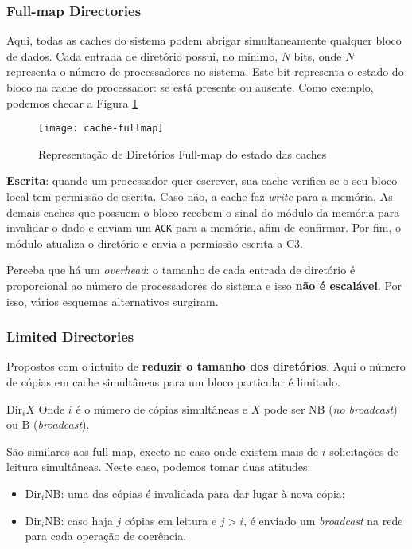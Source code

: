\subsubsection{Full-map Directories}
Aqui, todas as caches do sistema podem abrigar simultaneamente qualquer bloco de dados. Cada entrada de diretório possui, no mínimo, $N$ bits, onde $N$ representa o número de processadores no sistema. Este bit representa o estado do bloco na cache do processador: se está presente ou ausente. Como exemplo, podemos checar a Figura \ref{fig:cache-fullmap}

\begin{figure}
  \centering
  \texttt{[image: cache-fullmap]}
  \caption{Representação de Diretórios Full-map do estado das caches}
  \label{fig:cache-fullmap}
\end{figure}

\textbf{Escrita}: quando um processador quer escrever, sua cache verifica se o seu bloco local tem permissão de escrita. Caso não, a cache faz \textit{write} para a memória. As demais caches que possuem o bloco recebem o sinal do módulo da memória para invalidar o dado e enviam um \texttt{ACK} para a memória, afim de confirmar. Por fim, o módulo atualiza o diretório e envia a permissão escrita a C3.

Perceba que há um \textit{overhead}: o tamanho de cada entrada de diretório é proporcional ao número de processadores do sistema e isso \textbf{não é escalável}. Por isso, vários esquemas alternativos surgiram.




\subsubsection{Limited Directories}
Propostos com o intuito de \textbf{reduzir o tamanho dos diretórios}. Aqui o número de cópias em cache simultâneas para um bloco particular é limitado.

\begin{definicao}{Dir$_{i}X$}
  Onde $i$ é o número de cópias simultâneas e $X$ pode ser NB (\textit{no broadcast}) ou B (\textit{broadcast}).
\end{definicao}

São similares aos full-map, exceto no caso onde existem mais de $i$ solicitações de leitura simultâneas. Neste caso, podemos tomar duas atitudes:
\begin{itemize}
  \item $\text{Dir}_i\text{NB}$: uma das cópias é invalidada para dar lugar à nova cópia;

  \item $\text{Dir}_i\text{NB}$: caso haja $j$ cópias em leitura e $j > i$, é enviado um \textit{broadcast} na rede para cada operação de coerência.
\end{itemize}

